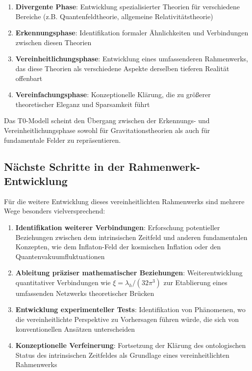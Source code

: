 \documentclass[12pt,a4paper]{article}
\begin{document}
	\begin{enumerate}
		\item \textbf{Divergente Phase}: Entwicklung spezialisierter Theorien für verschiedene Bereiche (z.B. Quantenfeldtheorie, allgemeine Relativitätstheorie)
		
		\item \textbf{Erkennungsphase}: Identifikation formaler Ähnlichkeiten und Verbindungen zwischen diesen Theorien
		
		\item \textbf{Vereinheitlichungsphase}: Entwicklung eines umfassenderen Rahmenwerks, das diese Theorien als verschiedene Aspekte derselben tieferen Realität offenbart
		
		\item \textbf{Vereinfachungsphase}: Konzeptionelle Klärung, die zu größerer theoretischer Eleganz und Sparsamkeit führt
	\end{enumerate}
	
	Das T0-Modell scheint den Übergang zwischen der Erkennungs- und Vereinheitlichungsphase sowohl für Gravitationstheorien als auch für fundamentale Felder zu repräsentieren.
	
	\subsection{Nächste Schritte in der Rahmenwerk-Entwicklung}
	\label{subsec:next_steps}
	
	Für die weitere Entwicklung dieses vereinheitlichten Rahmenwerks sind mehrere Wege besonders vielversprechend:
	
	\begin{enumerate}
		\item \textbf{Identifikation weiterer Verbindungen}: Erforschung potentieller Beziehungen zwischen dem intrinsischen Zeitfeld und anderen fundamentalen Konzepten, wie dem Inflaton-Feld der kosmischen Inflation oder den Quantenvakuumfluktuationen
		
		\item \textbf{Ableitung präziser mathematischer Beziehungen}: Weiterentwicklung quantitativer Verbindungen wie $\xi = \lambda_h/(32\pi^3)$ zur Etablierung eines umfassenden Netzwerks theoretischer Brücken
		
		\item \textbf{Entwicklung experimenteller Tests}: Identifikation von Phänomenen, wo die vereinheitlichte Perspektive zu Vorhersagen führen würde, die sich von konventionellen Ansätzen unterscheiden
		
		\item \textbf{Konzeptionelle Verfeinerung}: Fortsetzung der Klärung des ontologischen Status des intrinsischen Zeitfeldes als Grundlage eines vereinheitlichten Rahmenwerks
	\end{enumerate}
	
\end{document}
